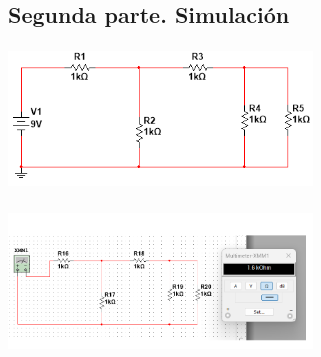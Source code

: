 \documentclass[10pt]{article}
\begin{document}
\subsection{Segunda parte. Simulación}
\begin{center}
	\includegraphics[width=8.075cm, height=3.791cm]{Imagenes/Circuito.png}
	
\end{center}
\begin{center}
	\includegraphics[width=8.075cm, height=3.791cm]{Imagenes/req.png}
\end{center}
\end{document}
